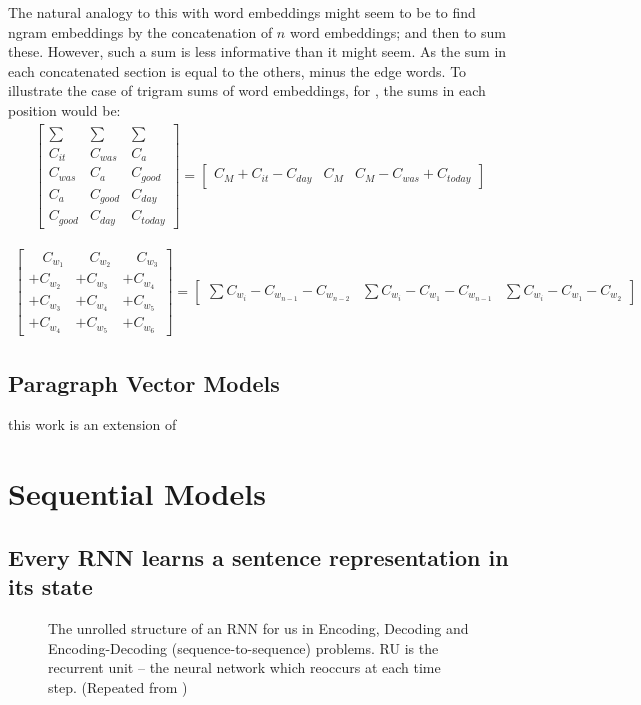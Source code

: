 \documentclass[12pt,parskip]{komatufte}
\begin{document}
The natural analogy to this with word embeddings might seem to be to find ngram embeddings by the concatenation of $n$ word embeddings; and then to sum these.
However, such a sum is less informative than it might seem.
As the sum in each concatenated section is equal to the others, minus the edge words. To illustrate the case of trigram sums of word embeddings, for ,
the sums in each position would be:
\begin{align}
\left[\begin{array}{c|c|c}
	\sum & \sum & \sum\\
	C_{it} & C_{was} & C_{a}\\
	C_{was} & C_{a} & C_{good}\\
	C_{a} & C_{good} & C_{day}\\
	C_{good} & C_{day} & C_{today}
\end{array}\right]=\left[\begin{array}{c|c|c}
	C_{M}+C_{it}-C_{day} & C_{M} & C_{M}-C_{was}+C_{today}\end{array}\right]
\end{align}

\begin{align}
\left[\begin{array}{c|c|c}
	\quad C_{w_{1}} & \quad C_{w_{2}} & \quad C_{w_{3}}\\
	+C_{w_{2}} & +C_{w_{3}} & +C_{w_{4}}\\
	+C_{w_{3}} & +C_{w_{4}} & +C_{w_{5}}\\
	+C_{w_{4}} & +C_{w_{5}} & +C_{w_{6}}
\end{array}\right]=\left[\begin{array}{c|c|c}
	\sum C_{w_{i}}-C_{w_{n-1}}-C_{w_{n-2}} & \sum C_{w_{i}}-C_{w_{1}}-C_{w_{n-1}} & \sum C_{w_{i}}-C_{w_{1}}-C_{w_{2}}\end{array}\right]
\end{align}

\subsection{Paragraph Vector Models}

this work is an extension of 

\section{Sequential Models}

\subsection{Every RNN learns a sentence representation in its state}
\begin{figure}
	\caption{The unrolled structure of an RNN for us in Encoding, Decoding and Encoding-Decoding (sequence-to-sequence) problems. RU is the recurrent unit -- the neural network which reoccurs at each time step. (Repeated from )
	}
	
	\label{fig-rnns-sq}
	
	\resizebox{\textwidth}{!}{}
\end{figure}
\end{document}
